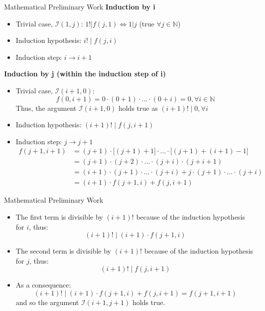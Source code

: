 \documentclass[xcolor=dvipsnames]{beamer}
\begin{document}
\begin{frame}{Mathematical Preliminary Work}
    \textbf{Induction by i}
    \begin{itemize}
        \item Trivial case, $\mathcal{I}(1, j)$: 
        $1! | f(j, 1) \Leftrightarrow 1 | j$ (true $\forall j \in \mathbb{N}$)
        \item Induction hypothesis: $i! \mid f(j, i)$
        \item Induction step: $i \rightarrow i + 1$
    \end{itemize}

    \pause

    \hfill

    \textbf{Induction by j (within the induction step of i)}
    \begin{itemize}
        \item Trivial case, $\mathcal{I}(i+1, 0)$: \\
        \[
            f(0, i+1) = 0 \cdot (0 + 1) \cdot ... \cdot (0 + i) = 0, \forall i \in \mathbb{N}
        \]
        Thus, the argument $\mathcal{I}(i+1, 0)$ holds true as $(i+1)! \mid 0, \forall i$
        \item Induction hypothesis: $(i+1)! \mid f(j, i+1)$
        \item Induction step: $j \rightarrow j + 1$
        { \small
        \begin{align*}
            f(j+1, i+1) &= (j+1) \cdot \bigl[(j+1) + 1\bigr] \cdot ... \cdot 
            \bigl[(j+1) + (i+1) - 1\bigr] \\
            &= (j+1) \cdot (j+2) \cdot ... \cdot (j+i) \cdot (j+i+1) \\
            &= (i+1)\cdot(j+1)\cdot ... \cdot (j+i) + j \cdot (j+1) \cdot ... \cdot (j+i) \\
            &= (i+1)\cdot f(j+1, i) + f(j, i+1)
        \end{align*}
        }
    \end{itemize}
\end{frame}

\begin{frame}{Mathematical Preliminary Work}
\begin{itemize}
    \item<1-> The first term is divisible by $(i+1)!$ because of the induction hypothesis for $i$, thus:
    \[
        (i+1)! \mid (i+1)\cdot f(j+1, i)
    \]
    \item<2-> The second term is divisible by $(i+1)!$ because of the induction hypothesis for $j$, thus:
    \[
        (i+1)! \mid f(j, i+1)
    \]
    \item<3-> As a consequence:
    \[
        (i+1)! \mid (i+1)\cdot f(j+1, i) + f(j, i+1) = f(j+1, i+1)
    \]
    and so the argument $\mathcal{I}(i+1, j+1)$ holds true.
\end{itemize}
\end{frame}
\end{document}
